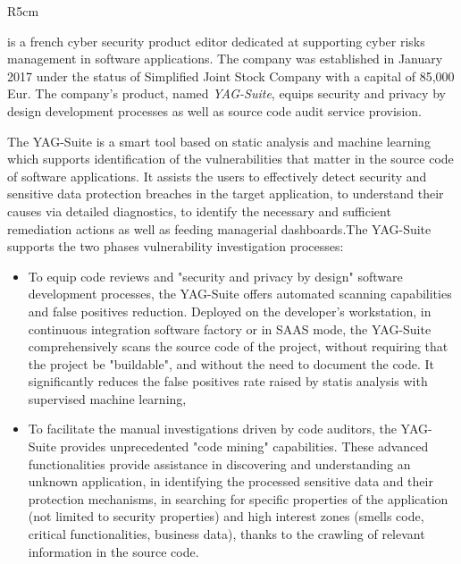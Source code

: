 \documentclass[a4paper,11pt]{article}
\begin{document}
\begin{wrapfigure}{R}{5cm}
\vspace{-1.3cm}
\hfill {}
\vspace{-0.8cm}
\end{wrapfigure}
\label{sec:participantYAG}

\YAGlong{} is a french cyber security product editor dedicated at supporting cyber risks management in software applications. The company was established in January 2017 under the status of Simplified Joint Stock Company with a capital of 85,000 Eur. The company's product, named \textit{YAG-Suite}, equips security and privacy by design development processes as well as source code audit service provision. 

The YAG-Suite is a smart tool based on static analysis and machine learning which supports identification of the vulnerabilities that matter in the source code of software applications. It assists the users to effectively detect security and sensitive data protection breaches in the target application, to understand their causes via detailed diagnostics, to identify the necessary and sufficient remediation actions as well as feeding managerial dashboards.The YAG-Suite supports the two phases vulnerability investigation processes:
\begin{itemize}
\item To equip code reviews and "security and privacy by design" software development processes, the YAG-Suite offers automated scanning capabilities and false positives reduction. Deployed on the developer's workstation, in continuous integration software factory or in SAAS mode, the YAG-Suite comprehensively scans the source code of the project, without requiring that the project be "buildable", and without the need to document the code. It significantly reduces the false positives rate raised by statis analysis with supervised machine learning,
\item To facilitate the manual investigations driven by code auditors, the YAG-Suite provides unprecedented "code mining" capabilities. These advanced functionalities provide assistance in discovering and understanding an unknown application, in identifying the processed sensitive data and their protection mechanisms, in searching for specific properties of the application (not limited to security properties) and high interest zones (smells code, critical functionalities, business data), thanks to the crawling of relevant information in the source code.
\end{itemize}
\end{document}
